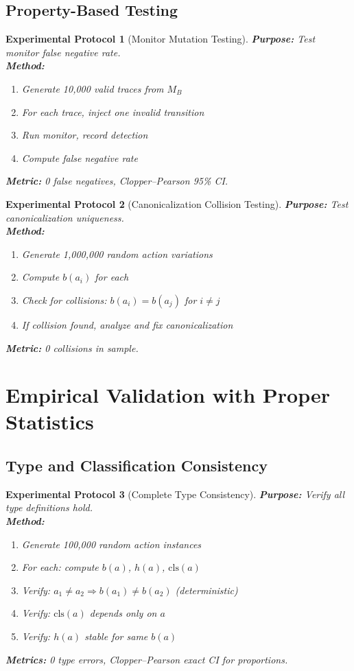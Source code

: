 \documentclass[12pt]{article}
\newtheorem{protocol}{Experimental Protocol}[section]
\begin{document}
\subsection{Property-Based Testing}

\begin{protocol}[Monitor Mutation Testing]
\textbf{Purpose:} Test monitor false negative rate.\\
\textbf{Method:}
\begin{enumerate}
    \item Generate 10,000 valid traces from $M_B$
    \item For each trace, inject one invalid transition
    \item Run monitor, record detection
    \item Compute false negative rate
\end{enumerate}
\textbf{Metric:} 0 false negatives, Clopper--Pearson 95\% CI.
\end{protocol}

\begin{protocol}[Canonicalization Collision Testing]
\textbf{Purpose:} Test canonicalization uniqueness.\\
\textbf{Method:}
\begin{enumerate}
    \item Generate 1,000,000 random action variations
    \item Compute $b(a_i)$ for each
    \item Check for collisions: $b(a_i) = b(a_j)$ for $i \neq j$
    \item If collision found, analyze and fix canonicalization
\end{enumerate}
\textbf{Metric:} 0 collisions in sample.
\end{protocol}

\section{Empirical Validation with Proper Statistics}

\subsection{Type and Classification Consistency}

\begin{protocol}[Complete Type Consistency]
\textbf{Purpose:} Verify all type definitions hold.\\
\textbf{Method:}
\begin{enumerate}
    \item Generate 100,000 random action instances
    \item For each: compute $b(a)$, $h(a)$, $\mathrm{cls}(a)$
    \item Verify: $a_1 \neq a_2 \Rightarrow b(a_1) \neq b(a_2)$ (deterministic)
    \item Verify: $\mathrm{cls}(a)$ depends only on $a$
    \item Verify: $h(a)$ stable for same $b(a)$
\end{enumerate}
\textbf{Metrics:} 0 type errors, Clopper--Pearson exact CI for proportions.
\end{protocol}
\end{document}
